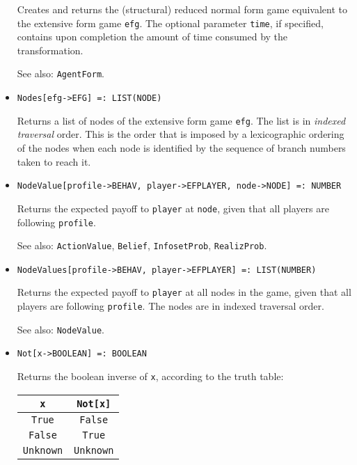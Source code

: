 \begin{itemize}
\bd
Creates and returns the (structural) reduced normal form game equivalent
to the extensive form game \verb+efg+.  The optional parameter \verb+time+,
if specified, contains upon completion the amount of time consumed by
the transformation.
\item [See also:] \verb+AgentForm+.
\ed

\item{}
\protect \large \begin{verbatim}
Nodes[efg->EFG] =: LIST(NODE) 
\end{verbatim}\normalsize

\bd
Returns a list of nodes of the extensive form game \verb+efg+.  The
list is in {\it indexed traversal} order.  This is the order that is
imposed by a lexicographic ordering of the nodes when each node is
identified by the sequence of branch numbers taken to reach it.  
\ed

\item{}
\protect \large \begin{verbatim}
NodeValue[profile->BEHAV, player->EFPLAYER, node->NODE] =: NUMBER 
\end{verbatim}\normalsize

\bd
Returns the expected payoff to \verb+player+ at \verb+node+, given
that all players are following \verb+profile+.
\item [See also:] \verb+ActionValue+, \verb+Belief+, \verb+InfosetProb+,
\verb+RealizProb+.
\ed

\item{}
\protect \large \begin{verbatim}
NodeValues[profile->BEHAV, player->EFPLAYER] =: LIST(NUMBER) 
\end{verbatim}\normalsize

\bd 
Returns the expected payoff to \verb+player+ at all nodes in the
game, given that all players are following \verb+profile+.  The nodes
are in indexed traversal order.
\item [See also:] \verb+NodeValue+.  
\ed

\item{}
\protect \large \begin{verbatim}
Not[x->BOOLEAN] =: BOOLEAN 
\end{verbatim}\normalsize

\bd
Returns the boolean inverse of \verb+x+, according to the truth table:
\begin{center}
\begin{tabular}{|c|c|}  \hline
\verb+x+ & \verb+Not[x]+ \\ \hline
\verb+True+ & \verb+False+ \\
\verb+False+ & \verb+True+ \\
\verb+Unknown+ & \verb+Unknown+ \\ \hline
\end{tabular}
\end{center}


\end{itemize}
